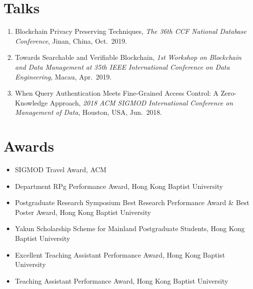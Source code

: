 \documentclass{mycv}
\begin{document}
\section{Talks}

\begin{enumerate}
  \item Blockchain Privacy Preserving Techniques, \emph{The 36th CCF National Database Conference}, Jinan, China, Oct.~2019.
  \item Towards Searchable and Verifiable Blockchain, \emph{1st Workshop on Blockchain and Data Management at 35th IEEE International Conference on Data Engineering}, Macau, Apr.~2019.
  \item When Query Authentication Meets Fine-Grained Access Control: A Zero-Knowledge Approach, \emph{2018 ACM SIGMOD International Conference on Management of Data}, Houston, USA, Jun.~2018.
\end{enumerate}

\section{Awards}

\begin{itemize}
  \item SIGMOD Travel Award, ACM 
  \item Department RPg Performance Award, Hong Kong Baptist University 
  \item Postgraduate Research Symposium Best Research Performance Award \& Best Poster Award, Hong Kong Baptist University 
  \item Yakun Scholarship Scheme for Mainland Postgraduate Students, Hong Kong Baptist University 
  \item Excellent Teaching Assistant Performance Award, Hong Kong Baptist University 
  \item Teaching Assistant Performance Award, Hong Kong Baptist University 
\end{itemize}
\end{document}
